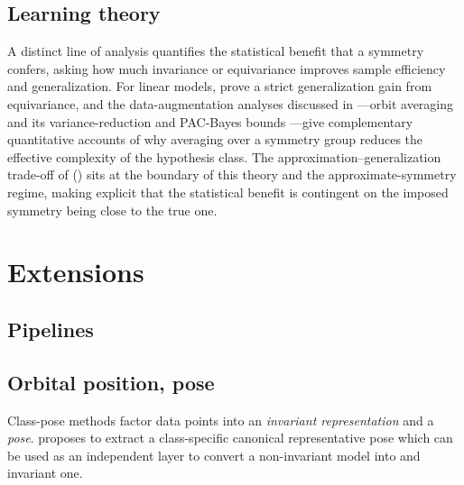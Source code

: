 \documentclass[mathematics,review,submit,moreauthors]{Definitions/mdpi}
\begin{document}
\subsection{Learning theory}
A distinct line of analysis quantifies the statistical benefit that a symmetry confers, asking how much invariance or equivariance improves sample efficiency and generalization.
For linear models, \citet{elesedy2021p3icml} prove a strict generalization gain from equivariance, and the data-augmentation analyses discussed in ---orbit averaging and its variance-reduction and PAC-Bayes bounds \citep{chen2020,lyle2020}---give complementary quantitative accounts of why averaging over a symmetry group reduces the effective complexity of the hypothesis class.
The approximation--generalization trade-off of \citet{petrache2023} () sits at the boundary of this theory and the approximate-symmetry regime, making explicit that the statistical benefit is contingent on the imposed symmetry being close to the true one.

\section{Extensions}

\subsection{Pipelines}

\subsection{Orbital position, pose}

Class-pose methods factor data points into an \textit{invariant representation} and a \textit{pose}.
\cite{urbano2026} proposes to extract a class-specific canonical representative pose which can be used as an independent layer to convert a non-invariant model into and invariant one.


\end{document}
